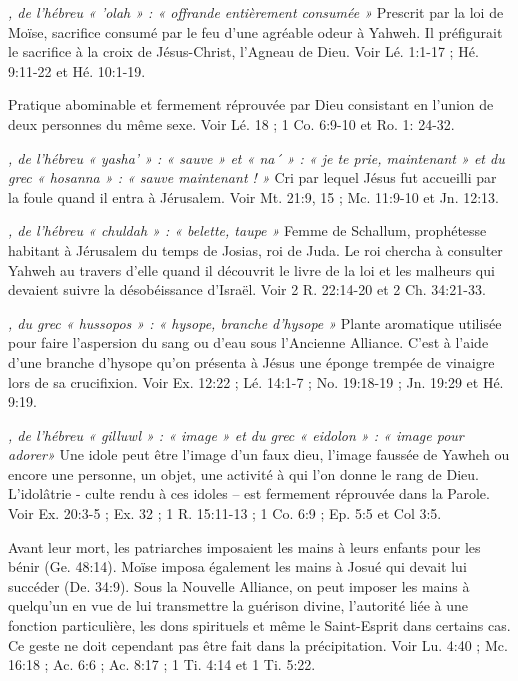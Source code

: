 \begin{multicols}{2}
\textit{, de l'hébreu « 'olah » : « offrande entièrement consumée »}\newline
Prescrit par la loi de Moïse, sacrifice consumé par le feu d'une agréable odeur à Yahweh. Il préfigurait le sacrifice à la croix de Jésus-Christ, l'Agneau de Dieu. Voir Lé. 1:1-17 ; Hé. 9:11-22 et Hé. 10:1-19.

\textit{}\newline
Pratique abominable et fermement réprouvée par Dieu consistant en l'union de deux personnes du même sexe. Voir Lé. 18 ; 1 Co. 6:9-10 et Ro. 1: 24-32.

\textit{, de l'hébreu « yasha' » : « sauve » et « na´ » : « je te prie, maintenant » et du grec « hosanna » : « sauve maintenant ! »}\newline
Cri par lequel Jésus fut accueilli par la foule quand il entra à Jérusalem. Voir Mt. 21:9, 15 ; Mc. 11:9-10 et Jn. 12:13.

\textit{, de l'hébreu « chuldah » : « belette, taupe »}\newline
Femme de Schallum, prophétesse habitant à Jérusalem du temps de Josias, roi de Juda. Le roi chercha à consulter Yahweh au travers d'elle quand il découvrit le livre de la loi et les malheurs qui devaient suivre la désobéissance d'Israël. Voir 2 R. 22:14-20 et 2 Ch. 34:21-33.

\textit{, du grec « hussopos » : « hysope, branche d'hysope »}\newline
Plante aromatique utilisée pour faire l'aspersion du sang ou d'eau sous l'Ancienne Alliance. C'est à l'aide d'une branche d'hysope qu'on présenta à Jésus une éponge trempée de vinaigre lors de sa crucifixion. Voir Ex. 12:22 ; Lé. 14:1-7 ; No. 19:18-19 ; Jn. 19:29 et Hé. 9:19.

\textit{, de l'hébreu « gilluwl » : « image » et du grec « eidolon » : « image pour adorer»}\newline
Une idole peut être l'image d'un faux dieu, l'image faussée de Yawheh ou encore une personne, un objet, une activité à qui l'on donne le rang de Dieu. L'idolâtrie - culte rendu à ces idoles – est fermement réprouvée dans la Parole. Voir Ex. 20:3-5 ; Ex. 32 ; 1 R. 15:11-13 ; 1 Co. 6:9 ; Ep. 5:5 et Col 3:5.

\textit{}\newline
Avant leur mort, les patriarches imposaient les mains à leurs enfants pour les bénir (Ge. 48:14). Moïse imposa également les mains à Josué qui devait lui succéder (De. 34:9). Sous la Nouvelle Alliance, on peut imposer les mains à quelqu'un en vue de lui transmettre la guérison divine, l'autorité liée à une fonction particulière, les dons spirituels et même le Saint-Esprit dans certains cas. Ce geste ne doit cependant pas être fait dans la précipitation. Voir Lu. 4:40 ; Mc. 16:18 ;  Ac. 6:6 ; Ac. 8:17 ; 1 Ti. 4:14 et 1 Ti. 5:22.


\end{multicols}
